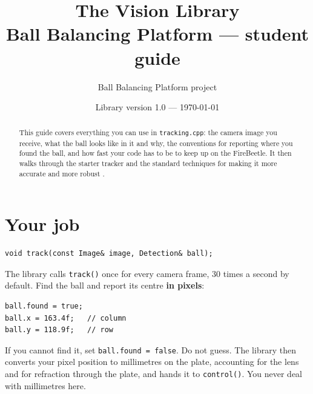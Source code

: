 \documentclass[10pt,a4paper]{article}
\title{The Vision Library\\[2pt]\large Ball Balancing Platform --- student guide}
\author{Ball Balancing Platform project}
\date{Library version 1.0 --- \today}
\begin{document}
\maketitle

\begin{abstract}
This guide covers everything you can use in \texttt{tracking.cpp}: the camera image you receive,
what the ball looks like in it and why, the conventions for reporting where you found the ball,
and how fast your code has to be to keep up on the FireBeetle. It then walks through the starter
tracker and the standard techniques for making it more accurate and more robust
\citep{gonzalez2018digital,szeliski2022computer}.
\end{abstract}

\tableofcontents

\section{Your job}
\begin{lstlisting}
void track(const Image& image, Detection& ball);
\end{lstlisting}
The library calls \texttt{track()} once for every camera frame, 30 times a second by default.
Find the ball and report its centre \textbf{in pixels}:
\begin{lstlisting}
ball.found = true;
ball.x = 163.4f;   // column
ball.y = 118.9f;   // row
\end{lstlisting}
If you cannot find it, set \texttt{ball.found = false}. Do not guess. The library then converts
your pixel position to millimetres on the plate, accounting for the lens and for refraction
through the plate, and hands it to \texttt{control()}. You never deal with millimetres here.

\end{document}
